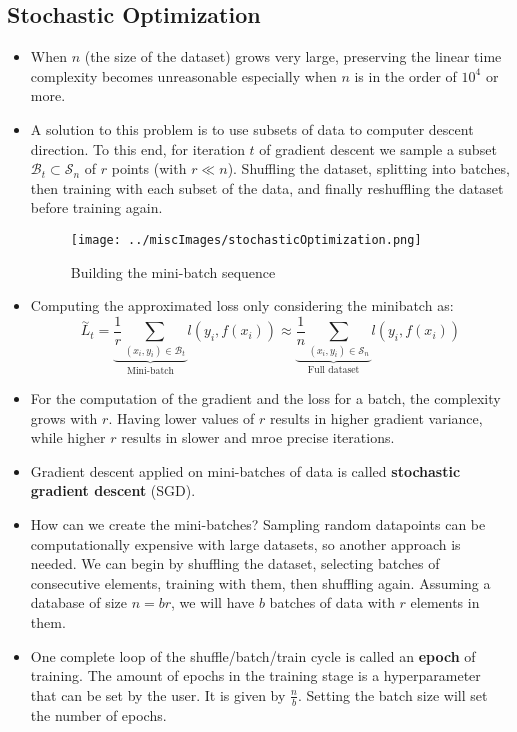 \documentclass{article}
\newcommand{\tbf}[1]{\textbf{#1}}
\begin{document}
        \subsection{Stochastic Optimization}
        \begin{itemize}
            \item When $n$ (the size of the dataset) grows very large, preserving the linear time complexity becomes unreasonable especially when $n$ is in the order of 
            $10^4$ or more.
            \item A solution to this problem is to use subsets of data to computer descent direction. To this end, for iteration $t$ of gradient descent we sample a subset $\mathcal{B}_t \subset \mathcal{S}_n$ of $r$ points (with $r \ll n$).
            Shuffling the dataset, splitting into batches, then training with each subset of the data, and finally reshuffling the dataset before training again. 
            \begin{figure}[h]
                \centering
                \texttt{[image: ../miscImages/stochasticOptimization.png]} 
                \caption{Building the mini-batch sequence}
                \label{fig:example}
            \end{figure}
            \item Computing the approximated loss only considering the minibatch as:
            \[\overset{\sim}{L}_t = \underbrace{\frac{1}{r} \sum _{(x_i, y_i) \in \mathcal{B}_t}}_{\text{Mini-batch}}l(y_i, f(x_i)) \approx \underbrace{\frac{1}{n} \sum _{(x_i, y_i) \in \mathcal{S}_n}}_{\text{Full dataset}} l(y_i, f(x_i))\]
            \item For the computation of the gradient and the loss for a batch, the complexity grows with $r$. Having lower values of $r$ results in higher gradient variance, while higher $r$ results in slower and mroe precise iterations.
            \item Gradient descent applied on mini-batches of data is called \tbf{stochastic gradient descent} (SGD). 
            \item How can we create the mini-batches? Sampling random datapoints can be computationally expensive with large datasets, so another approach is needed. We can begin by shuffling the dataset, selecting batches of consecutive elements, training with them, then shuffling again.
            Assuming a database of size $n = br$, we will have $b$ batches of data with $r$ elements in them.
            \item One complete loop of the shuffle/batch/train cycle is called an \tbf{epoch} of training. The amount of epochs in the training stage is a hyperparameter that can be set by the user. It is given by $\frac{n}{b}$. Setting the batch size will set the number of epochs.
        \end{itemize}
\end{document}
